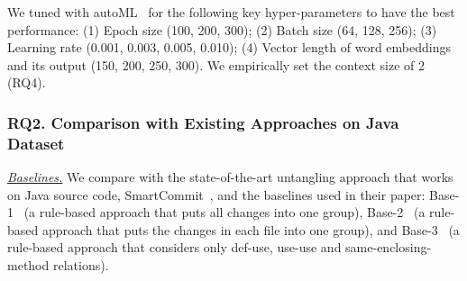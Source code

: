 We tuned {\tool} with autoML~\cite{NNI} for the following key
hyper-pa\-rameters to have the best performance: (1) Epoch size (100,
200, 300); (2) Batch size (64, 128, 256); (3) Learning rate (0.001,
0.003, 0.005, 0.010); (4) Vector length of word embeddings and its
output (150, 200, 250, 300). We empirically set the context size of 2
(RQ4).





\subsubsection{\bf RQ2. Comparison with Existing Approaches on Java Dataset}

{\em \underline{Baselines.}} We compare {\tool} with the
state-of-the-art untangling approach that works on Java source code,
SmartCommit~\cite{smartcommit-fse21}, and the baselines used in their
paper: Base-1~\cite{smartcommit-fse21} (a rule-based approach that
puts all changes into one group), Base-2~\cite{smartcommit-fse21} (a
rule-based approach that puts the changes in each file into one
group), and Base-3~\cite{smartcommit-fse21} (a rule-based approach
that considers only def-use, use-use and same-enclosing-method
relations).



